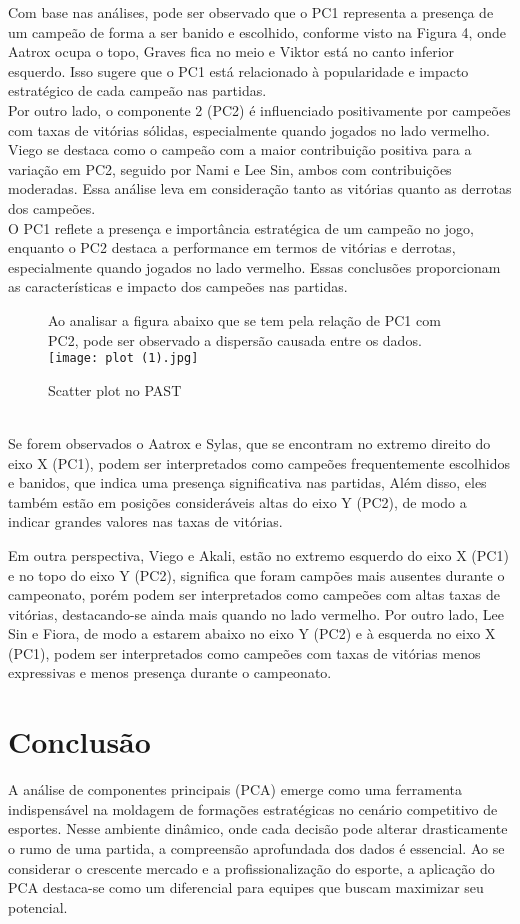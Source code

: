 \documentclass[a4paper,12pt]{article}
\begin{document}
Com base nas análises, pode ser observado que o PC1 representa a presença de um campeão de forma a ser banido e escolhido, conforme visto na Figura 4, onde Aatrox ocupa o topo, Graves fica no meio e Viktor está no canto inferior esquerdo. Isso sugere que o PC1 está relacionado à popularidade e impacto estratégico de cada campeão nas partidas.\\

Por outro lado, o componente 2 (PC2) é influenciado positivamente por campeões com taxas de vitórias sólidas, especialmente quando jogados no lado vermelho. Viego se destaca como o campeão com a maior contribuição positiva para a variação em PC2, seguido por Nami e Lee Sin, ambos com contribuições moderadas. Essa análise leva em consideração tanto as vitórias quanto as derrotas dos campeões.\\

O PC1 reflete a presença e importância estratégica de um campeão no jogo, enquanto o PC2 destaca a performance em termos de vitórias e derrotas, especialmente quando jogados no lado vermelho. Essas conclusões proporcionam as características e impacto dos campeões nas partidas.
\pagebreak\\
\begin{figure}[h]
Ao analisar a figura abaixo que se tem pela relação de PC1 com PC2, pode ser observado a dispersão causada entre os dados.
    \centering
    \texttt{[image: plot (1).jpg]}
    \caption{Scatter plot no PAST}
    \label{fig:enter-label}
\end{figure}\\
Se forem observados o Aatrox e Sylas, que se encontram no extremo direito do eixo X (PC1), podem ser interpretados como campeões frequentemente escolhidos e banidos, que indica uma presença significativa nas partidas, Além disso, eles também estão em posições consideráveis altas do eixo Y (PC2), de modo a indicar grandes valores nas taxas de vitórias.

Em outra perspectiva, Viego e Akali, estão no extremo esquerdo do eixo X (PC1) e no topo do eixo Y (PC2), significa que foram campões mais ausentes durante o campeonato, porém  podem ser interpretados como campeões com altas taxas de vitórias, destacando-se ainda mais quando no lado vermelho. Por outro lado, Lee Sin e Fiora, de modo a estarem abaixo no eixo Y (PC2) e à esquerda no eixo X (PC1), podem ser interpretados como campeões com taxas de vitórias menos expressivas e menos presença durante o campeonato.
\section{Conclusão}
A análise de componentes principais (PCA) emerge como uma ferramenta indispensável na moldagem de formações estratégicas no cenário competitivo de esportes. Nesse ambiente dinâmico, onde cada decisão pode alterar drasticamente o rumo de uma partida, a compreensão aprofundada dos dados é essencial. Ao se considerar o crescente mercado e a profissionalização do esporte, a aplicação do PCA destaca-se como um diferencial para equipes que buscam maximizar seu potencial.
\end{document}
